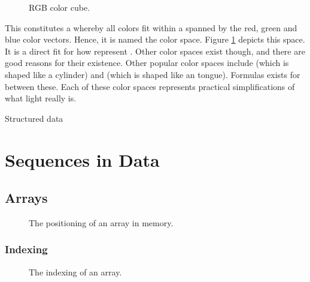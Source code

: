 \begin{figure}[tbp]
  
  \caption{RGB color cube.}
  \label{fig:primdata:struct:color}
\end{figure}

This constitutes a  whereby all colors fit within a  spanned by the red, green and blue color vectors. Hence, it is named the  color space. Figure \ref{fig:primdata:struct:color} depicts this space. It is a direct fit for how  represent . Other color spaces exist though, and there are good reasons for their existence. Other popular color spaces include  (which is shaped like a cylinder) and  (which is shaped like an tongue). Formulas exists for  between these. Each of these color spaces represents practical simplifications of what light really is.

\csharpsubsection{\csharp}


\begin{syntaxfloat}
  
  \caption{Structured data}
  \label{syntax:data:struct}
\end{syntaxfloat}

\section{Sequences in Data}

\subsection{Arrays}

\begin{figure}[tbp]
  
  \caption{The positioning of an array in memory.}
  \label{fig:data:array:alloc}
\end{figure}

\subsubsection{Indexing}


\begin{figure}[tbp]
  
  \caption{The indexing of an array.}
  \label{fig:data:array:index}
\end{figure}

